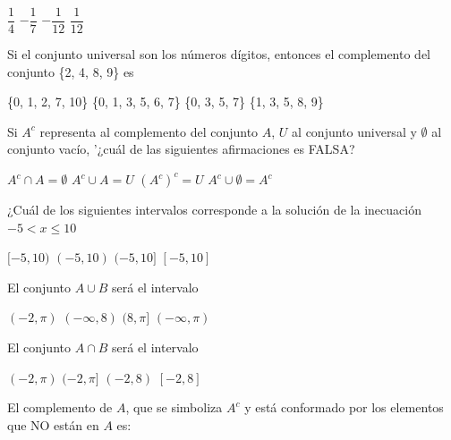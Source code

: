\documentclass[10pt,letterpaper,addpoints]{exam}
\begin{document}
\begin{multicols}{2}
\begin{questions}
\begin{oneparchoices}
\choice $\dfrac{1}{4}$
\choice $-\dfrac{1}{7}$
\CorrectChoice $-\dfrac{1}{12}$
\choice $\dfrac{1}{12}$
\end{oneparchoices}
\question Si el conjunto universal son los números dígitos, entonces el complemento del conjunto \{2, 4, 8, 9\} es
\begin{choices}
\begin{multicols}{2}
\choice \{0, 1, 2, 7, 10\}
\CorrectChoice \{0, 1, 3, 5, 6, 7\}
\choice \{0, 3, 5, 7\}
\choice \{1, 3, 5, 8, 9\}
\end{multicols}
\end{choices}
\question Si $A^{c}$ representa al complemento del conjunto $A$, $U$ al conjunto universal y $\emptyset$ al conjunto vacío, '¿cuál de las siguientes afirmaciones es FALSA?
\begin{choices}
\begin{multicols}{2}
\choice $A^{c}\cap A=\emptyset$
\choice $A^{c}\cup A=U$
\CorrectChoice $(A^{c})^{c}=U$
\choice $A^{c}\cup \emptyset=A^{c}$
\end{multicols}
\end{choices}
\question ¿Cuál de los siguientes intervalos corresponde a la solución de la inecuación $-5<x\leq 10$
\begin{choices}
\begin{multicols}{2}
\choice $[-5,10)$ 
\choice $(-5,10)$
\CorrectChoice $(-5,10]$
\choice $[-5,10]$
\end{multicols}
\end{choices}
\uplevel{Dados los conjuntos $A=(-2,8)$ y $B=(-\infty,\pi]$, responda las preguntas \ref{firstq1}--\ref{lastq1}}
\question \label{firstq1} El conjunto $A\cup B$ será el intervalo
\begin{choices}
\begin{multicols}{2}
 \choice $(-2,\pi)$
 \CorrectChoice $(-\infty,8)$
 \choice $(8,\pi]$
 \choice $(-\infty,\pi)$
\end{multicols}
\end{choices}
\question El conjunto $A \cap B $ será el intervalo
\begin{choices}
\begin{multicols}{2}
 \choice $(-2,\pi)$
 \CorrectChoice $(-2,\pi]$
 \choice $(-2,8)$
 \choice $[-2,8]$
\end{multicols}
\end{choices}
\question \label{lastq1} El complemento de $A$, que se simboliza $A^{c}$ y está conformado por los elementos que NO están en $A$ es:


\end{questions}
\end{multicols}
\end{document}
